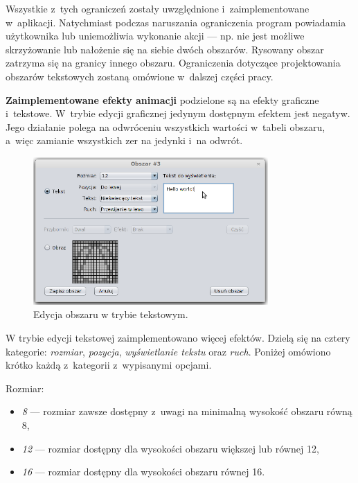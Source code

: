 Wszystkie z~tych ograniczeń zostały uwzględnione i~zaimplementowane w~aplikacji. Natychmiast podczas naruszania ograniczenia program powiadamia użytkownika lub uniemożliwia wykonanie akcji --- np. nie jest możliwe skrzyżowanie lub nałożenie się na siebie dwóch obszarów. Rysowany obszar zatrzyma się na granicy innego obszaru. Ograniczenia dotyczące projektowania obszarów tekstowych zostaną omówione w~dalszej części pracy.


\textbf{Zaimplementowane efekty animacji} podzielone są na efekty graficzne i~tekstowe. W~trybie edycji graficznej jedynym dostępnym efektem jest negatyw. Jego działanie polega na odwróceniu wszystkich wartości w~tabeli obszaru, a~więc zamianie wszystkich zer na jedynki i~na odwrót.

\begin{figure}[htb]
	\begin{center}
		\includegraphics[width=0.8\textwidth]{figures/areaText.png}
	\end{center}
	\caption{Edycja obszaru w trybie tekstowym.}
\end{figure}

W trybie edycji tekstowej zaimplementowano więcej efektów. Dzielą się na cztery kategorie: \textit{rozmiar}, \textit{pozycja}, \textit{wyświetlanie tekstu} oraz \textit{ruch}. Poniżej omówiono krótko każdą z~kategorii z~wypisanymi opcjami.

Rozmiar:

\begin{itemize}
	\item \textit{8} --- rozmiar zawsze dostępny z~uwagi na minimalną wysokość obszaru równą 8,
	\item \textit{12} --- rozmiar dostępny dla wysokości obszaru większej lub równej 12,
	\item \textit{16} --- rozmiar dostępny dla wysokości obszaru równej 16.
\end{itemize}

